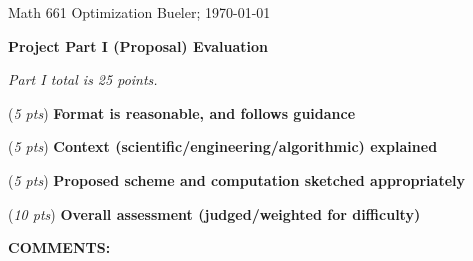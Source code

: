 \documentclass[12pt]{amsart}
\begin{document}
\scriptsize \noindent Math 661 Optimization \hfill  Bueler; \today
\normalsize\bigskip

\thispagestyle{empty}
\noindent\large\centerline{\textbf{Project Part I (Proposal) Evaluation}} \normalsize

\medskip
\noindent\centerline{\emph{Part I total is 25 points.}}

\bigskip\bigskip

\noindent (\emph{5 pts}) \textbf{Format is reasonable, and follows guidance}  
\vspace{0.8in}

\noindent (\emph{5 pts}) \textbf{Context (scientific/engineering/algorithmic) explained}
\vspace{0.8in}

\noindent (\emph{5 pts}) \textbf{Proposed scheme and computation sketched appropriately}
\vspace{0.8in}

\noindent (\emph{10 pts}) \textbf{Overall assessment (judged/weighted for difficulty)}
\vspace{1.4in}


\noindent \textbf{COMMENTS:}
\vfill
\end{document}
